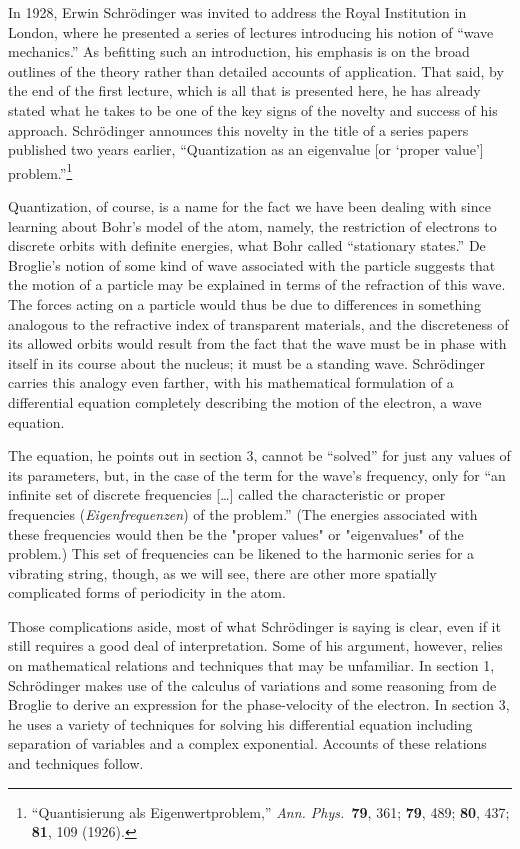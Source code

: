 In 1928, Erwin Schrödinger was invited to address the Royal Institution in London, where he presented a series of lectures introducing his notion of “wave mechanics.” As befitting such an introduction, his emphasis is on the broad outlines of the theory rather than detailed accounts of application. That said, by the end of the first lecture, which is all that is presented here, he has already stated what he takes to be one of the key signs of the novelty and success of his approach. Schrödinger announces this novelty in the title of a series papers published two years earlier, “Quantization as an eigenvalue [or ‘proper value’] problem.”\footnote{``Quantisierung als Eigenwertproblem,'' 
\emph{Ann. Phys.\ }\textbf{79}, 361; \textbf{79}, 489; \textbf{80}, 437; \textbf{81}, 109 (1926).}

Quantization, of course, is a name for the fact we have been dealing with since learning about Bohr’s model of the atom, namely, the restriction of electrons to discrete orbits with definite energies, what Bohr called “stationary states.” De Broglie’s notion of some kind of wave associated with the particle suggests that the motion of a particle may be explained in terms of the refraction of this wave. The forces acting on a particle would thus be due to differences in something analogous to the refractive index of transparent materials, and the discreteness of its allowed orbits would result from the fact that the wave must be in phase with itself in its course about the nucleus; it must be a standing wave. Schrödinger carries this analogy even farther, with his mathematical formulation of a differential equation completely describing the motion of the electron, a wave equation.

The equation, he points out in section 3, cannot be “solved” for just any values of its parameters, but, in the case of the term for the wave’s frequency, only for “an infinite set of discrete frequencies […] called the characteristic or proper frequencies (\emph{Eigenfrequenzen}) of the problem.” (The energies associated with these frequencies would then be the "proper values" or "eigenvalues" of the problem.) This set of frequencies can be likened to the harmonic series for a vibrating string, though, as we will see, there are other more spatially complicated forms of periodicity in the atom.

Those complications aside, most of what Schrödinger is saying is clear, even if it still requires a good deal of interpretation. Some of his argument, however, relies on mathematical relations and techniques that may be unfamiliar. In section 1, Schrödinger makes use of the calculus of variations and some reasoning from de Broglie to derive an expression for the phase-velocity of the electron. In section 3, he uses a variety of techniques for solving his differential equation including separation of variables and a complex exponential. Accounts of these relations and techniques follow.

